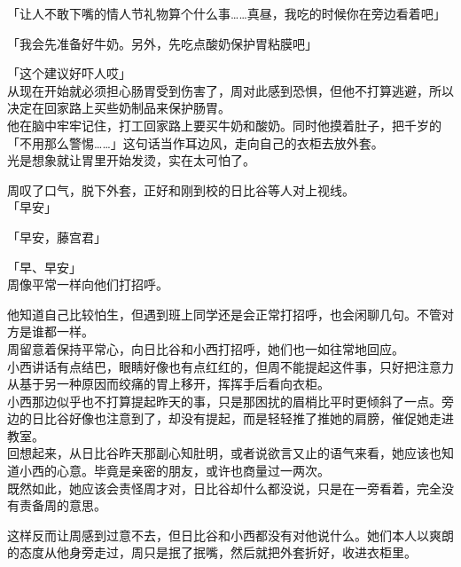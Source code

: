 「让人不敢下嘴的情人节礼物算个什么事……真昼，我吃的时候你在旁边看着吧」

「我会先准备好牛奶。另外，先吃点酸奶保护胃粘膜吧」

「这个建议好吓人哎」\\

从现在开始就必须担心肠胃受到伤害了，周对此感到恐惧，但他不打算逃避，所以决定在回家路上买些奶制品来保护肠胃。\\

他在脑中牢牢记住，打工回家路上要买牛奶和酸奶。同时他摸着肚子，把千岁的「不用那么警惕……」这句话当作耳边风，走向自己的衣柜去放外套。\\

光是想象就让胃里开始发烫，实在太可怕了。

周叹了口气，脱下外套，正好和刚到校的日比谷等人对上视线。\\

「早安」

「早安，藤宫君」

「早、早安」\\

周像平常一样向他们打招呼。

他知道自己比较怕生，但遇到班上同学还是会正常打招呼，也会闲聊几句。不管对方是谁都一样。\\

周留意着保持平常心，向日比谷和小西打招呼，她们也一如往常地回应。\\

小西讲话有点结巴，眼睛好像也有点红红的，但周不能提起这件事，只好把注意力从基于另一种原因而绞痛的胃上移开，挥挥手后看向衣柜。\\

小西那边似乎也不打算提起昨天的事，只是那困扰的眉梢比平时更倾斜了一点。旁边的日比谷好像也注意到了，却没有提起，而是轻轻推了推她的肩膀，催促她走进教室。\\

回想起来，从日比谷昨天那副心知肚明，或者说欲言又止的语气来看，她应该也知道小西的心意。毕竟是亲密的朋友，或许也商量过一两次。\\

既然如此，她应该会责怪周才对，日比谷却什么都没说，只是在一旁看着，完全没有责备周的意思。

这样反而让周感到过意不去，但日比谷和小西都没有对他说什么。她们本人以爽朗的态度从他身旁走过，周只是抿了抿嘴，然后就把外套折好，收进衣柜里。\\

\vspace{2\baselineskip}

